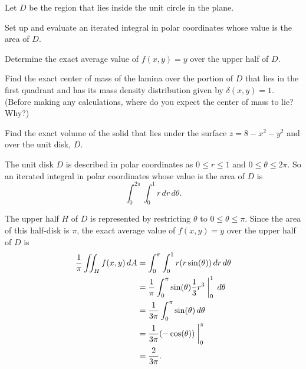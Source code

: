 \begin{exercises}
\item Let $D$ be the region that lies inside the unit circle in the plane.
	
\ba
	\item Set up and evaluate an iterated integral in polar coordinates whose value is the area of $D$.
	\item Determine the exact average value of $f(x,y) = y$ over the upper half of $D$.
	\item Find the exact center of mass of the lamina over the portion of $D$ that lies in the first quadrant and has its mass density distribution given by $\delta(x,y) = 1$. (Before making any calculations, where do you expect the center of mass to lie? Why?)
	\item Find the exact volume of the solid that lies under the surface $z = 8-x^2-y^2$ and over the unit disk, $D$.
\ea

\begin{exerciseSolution}
\ba
	\item The unit disk $D$ is described in polar coordinates as $0 \leq r \leq 1$ and $0 \leq \theta \leq 2 \pi$. So an iterated integral in polar coordinates whose value is the area of $D$ is 
	\[\int_{0}^{2 \pi} \int_{0}^{1} r \, dr \, d\theta.\]
	
	\item The upper half $H$ of $D$ is represented by restricting $\theta$ to $0 \leq \theta \leq \pi$. Since the area of this half-disk is $\pi$, the exact average value of $f(x,y) = y$ over the upper half of $D$ is
	\begin{align*}
	\frac{1}{\pi} \iint_H f(x,y) \, dA &=  \int_{0}^{\pi} \int_{0}^{1} r (r\sin(\theta)) \, dr \, d\theta \\
		&= \frac{1}{\pi} \int_{0}^{\pi} \sin(\theta) \frac{1}{3}r^3\biggm|_{0}^{1} \, d\theta \\
		&= \frac{1}{3 \pi} \int_{0}^{\pi} \sin(\theta) \, d\theta \\
		&= \frac{1}{3 \pi} (-\cos(\theta))\biggm|_{0}^{\pi} \\
		&= \frac{2}{3\pi}.
	\end{align*}
	

\end{exerciseSolution}
\end{exercises}
